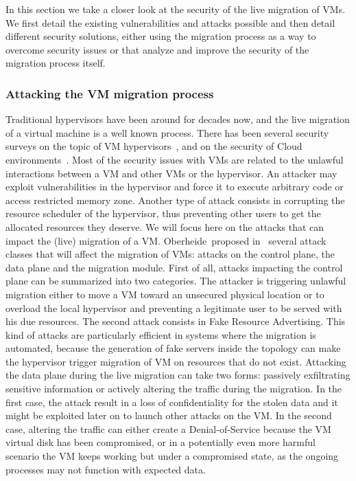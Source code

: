 In this section we take a closer look at the security of the live migration of VMs.
We first detail the existing vulnerabilities and attacks possible and then detail different security solutions, either using the migration process as a way to overcome security issues or that analyze and improve the security of the migration process itself.

\subsubsection{Attacking the VM migration process}
Traditional hypervisors have been around for decades now, and the live migration of a virtual machine is a well known process. There has been several security surveys on the topic of VM hypervisors~\cite{Reuben2007,Rehman2013,Sahoo2010,Perez-Botero2013}, and on the security of Cloud environments~\cite{cloudenvironmentsecuritysurvey-fernandes2014}.
Most of the security issues with VMs are related to the unlawful interactions between a VM and other VMs or the hypervisor.
An attacker may exploit vulnerabilities in the hypervisor and force it to execute arbitrary code or access restricted memory zone.
Another type of attack consists in corrupting the resource scheduler of the hypervisor, thus preventing other users to get the allocated resources they deserve.
We will focus here on the attacks that can impact the (live) migration of a VM.
Oberheide~\etal proposed in~\cite{empirical-oberheide2008} several attack classes that will affect the migration of VMs: attacks on the control plane, the data plane and the migration module.
First of all, attacks impacting the control plane can be summarized into two categories. The attacker is triggering unlawful migration either to move a VM toward an unsecured physical location or to overload the local hypervisor and preventing a legitimate user to be served with his due resources.
The second attack consists in Fake Resource Advertising. This kind of attacks are particularly efficient in systems where the migration is automated, because the generation of fake servers inside the topology can make the hypervisor trigger migration of VM on resources that do not exist.
Attacking the data plane during the live migration can take two forms: passively exfiltrating sensitive information or actively altering the traffic during the migration.
In the first case, the attack result in a loss of confidentiality for the stolen data and it might be exploited later on to launch other attacks on the VM.
In the second case, altering the traffic can either create a Denial-of-Service because the VM virtual disk has been compromised, or in a potentially even more harmful scenario the VM keeps working but under a compromised state, as the ongoing processes may not function with expected data.
